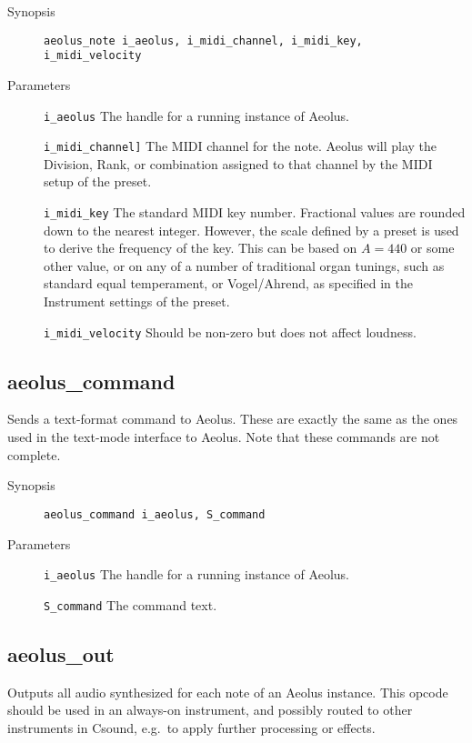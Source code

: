 \documentclass[english,11pt,letterpaper,onecolumn]{scrartcl}
\begin{document}
{\begin{description}
	\item[Synopsis]
	\item[]\lstinline|aeolus_note i_aeolus, i_midi_channel, i_midi_key, i_midi_velocity|
	\item[Parameters]
	\item[]\lstinline|i_aeolus| The handle for a running instance of Aeolus.
	\item[]\lstinline|i_midi_channel]| The MIDI channel for the note. Aeolus will play the Division, Rank, or combination assigned to that channel by the MIDI setup of the preset.
	\item[]\lstinline|i_midi_key| The standard MIDI key number. Fractional values are rounded down to the nearest integer. However, the scale defined by a preset is used to derive the frequency of the key. This can be based on $A = 440$ or some other value, or on any of a number of traditional organ tunings, such as standard equal temperament, or Vogel/Ahrend, as specified in the Instrument settings of the preset.
	\item[]\lstinline|i_midi_velocity| Should be non-zero but does not affect loudness.
\end{description}

\subsection*{aeolus\_command}

Sends a text-format command to Aeolus. These are exactly the same as the ones used in the text-mode interface to Aeolus. Note that these commands are not complete.

\begin{description}
	\item[Synopsis]
	\item[]\lstinline|aeolus_command i_aeolus, S_command|
	\item[Parameters]
	\item[]\lstinline|i_aeolus| The handle for a running instance of Aeolus.
	\item[]\lstinline|S_command| The command text.
\end{description}

\subsection*{aeolus\_out}

Outputs all audio synthesized for each note of an Aeolus instance. This opcode should be used in an always-on instrument, and possibly routed to other instruments in Csound, e.g.\ to apply further processing or effects.

}
\end{document}
